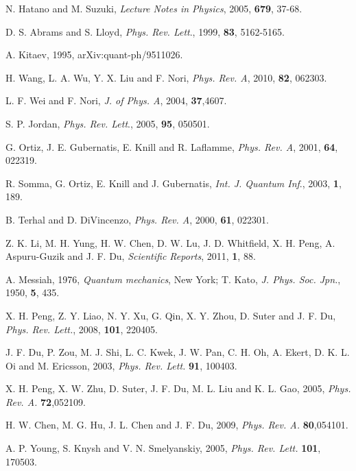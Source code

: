 \documentclass[8.5pt,twoside,twocolumn]{article}
\begin{document}
\begin{thebibliography}{99}
N. Hatano and M. Suzuki, \emph{Lecture Notes in Physics}, 2005, \textbf{679}, 37-68.

D. S. Abrams and S. Lloyd, \emph{Phys. Rev. Lett}., 1999, \textbf{83}, 5162-5165.

A. Kitaev, 1995, arXiv:quant-ph/9511026.

H. Wang, L. A. Wu, Y. X. Liu and F. Nori, \emph{Phys. Rev. A}, 2010, \textbf{82}, 062303.

L. F. Wei and F. Nori, \emph{J. of Phys. A}, 2004, \textbf{37},4607.

S. P. Jordan, \emph{Phys. Rev. Lett}., 2005, \textbf{95}, 050501.

G. Ortiz, J. E. Gubernatis, E. Knill and R. Laflamme, \emph{Phys. Rev. A}, 2001, \textbf{64}, 022319.

R. Somma, G. Ortiz, E. Knill and J. Gubernatis, \emph{Int. J. Quantum Inf}., 2003, \textbf{1}, 189.

B. Terhal and D. DiVincenzo, \emph{Phys. Rev. A}, 2000, \textbf{61}, 022301.

Z. K. Li, M. H. Yung, H. W. Chen, D. W. Lu, J. D. Whitfield, X. H. Peng, A. Aspuru-Guzik and J. F. Du, \emph{Scientific Reports}, 2011, \textbf{1}, 88.

A. Messiah, 1976, \emph{Quantum mechanics}, New York; T. Kato, {\it J. Phys. Soc. Jpn.}, 1950, \textbf{5}, 435.

X. H. Peng, Z. Y. Liao, N. Y. Xu, G. Qin, X. Y. Zhou, D. Suter and J. F. Du, \emph{Phys. Rev. Lett.}, 2008, \textbf{101}, 220405.

 J. F. Du, P. Zou, M. J. Shi, L. C. Kwek, J. W. Pan, C. H. Oh, A. Ekert, D. K. L. Oi and M. Ericsson, 2003, {\it Phys. Rev. Lett.} \textbf{91}, 100403.

 X. H. Peng, X. W. Zhu, D. Suter, J. F. Du, M. L. Liu and K. L. Gao, 2005, {\it Phys. Rev. A.} \textbf{72},052109.

 H. W. Chen, M. G. Hu, J. L. Chen and J. F. Du, 2009, {\it Phys. Rev. A.} \textbf{80},054101.


 A. P. Young, S. Knysh and V. N. Smelyanskiy, 2005, {\it Phys. Rev.
Lett.} \textbf{101}, 170503.


\end{thebibliography}
\end{document}
